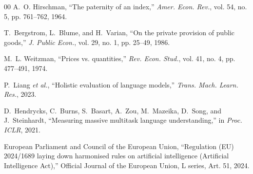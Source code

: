 \documentclass[conference]{IEEEtran}
\theoremstyle{definition}
\begin{document}
\begin{thebibliography}{00}
 A.~O. Hirschman, ``The paternity of an index,''
\emph{Amer. Econ. Rev.}, vol. 54, no. 5, pp. 761--762, 1964.

 T.~Bergstrom, L.~Blume, and H.~Varian, ``On the
private provision of public goods,'' \emph{J. Public Econ.}, vol. 29, no. 1,
pp. 25--49, 1986.

 M.~L. Weitzman, ``Prices vs. quantities,'' \emph{Rev.
Econ. Stud.}, vol. 41, no. 4, pp. 477--491, 1974.

 P.~Liang \emph{et al.}, ``Holistic evaluation of language
models,'' \emph{Trans. Mach. Learn. Res.}, 2023.

 D.~Hendrycks, C.~Burns, S.~Basart, A.~Zou,
M.~Mazeika, D.~Song, and J.~Steinhardt, ``Measuring massive multitask language
understanding,'' in \emph{Proc. ICLR}, 2021.

 European Parliament and Council of the European Union,
``Regulation (EU) 2024/1689 laying down harmonised rules on artificial
intelligence (Artificial Intelligence Act),'' Official Journal of the European
Union, L series, Art. 51, 2024.

\end{thebibliography}
\end{document}
